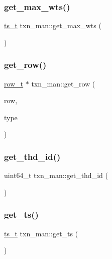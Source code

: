 \subsubsection{\texorpdfstring{get\+\_\+max\+\_\+wts()}{get\_max\_wts()}}
{\footnotesize\ttfamily \hyperlink{global_8h_aaf095dfc9b10f757c968fe146ad7e724}{ts\+\_\+t} txn\+\_\+man\+::get\+\_\+max\+\_\+wts (\begin{DoxyParamCaption}{ }\end{DoxyParamCaption})\hspace{0.3cm}{\ttfamily [inline]}}

\mbox{\label{classtxn__man_aa9ae01517fa1520cb8c910f72afb72d1}} 
\subsubsection{\texorpdfstring{get\+\_\+row()}{get\_row()}}
{\footnotesize\ttfamily \hyperlink{classrow__t}{row\+\_\+t} $\ast$ txn\+\_\+man\+::get\+\_\+row (\begin{DoxyParamCaption}\item[{\hyperlink{classrow__t}{row\+\_\+t} $\ast$}]{row,  }\item[{\hyperlink{global_8h_a567f81b0ae33b00d189d7714e9fde0bc}{access\+\_\+t}}]{type }\end{DoxyParamCaption})}

\mbox{\label{classtxn__man_ae1c3f482994caa8cc40970b3bb62e529}} 
\subsubsection{\texorpdfstring{get\+\_\+thd\+\_\+id()}{get\_thd\_id()}}
{\footnotesize\ttfamily uint64\+\_\+t txn\+\_\+man\+::get\+\_\+thd\+\_\+id (\begin{DoxyParamCaption}{ }\end{DoxyParamCaption})}

\mbox{\label{classtxn__man_a1ed4112864a14e2d2ac24cc3ba90417a}} 
\subsubsection{\texorpdfstring{get\+\_\+ts()}{get\_ts()}}
{\footnotesize\ttfamily \hyperlink{global_8h_aaf095dfc9b10f757c968fe146ad7e724}{ts\+\_\+t} txn\+\_\+man\+::get\+\_\+ts (\begin{DoxyParamCaption}{ }\end{DoxyParamCaption})}

